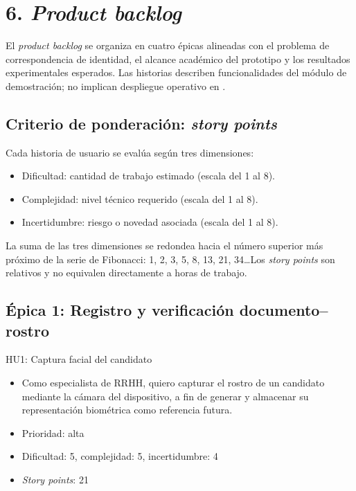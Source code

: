 \documentclass[
  11pt, %
]{charter}
\begin{document}
\section{6. \textit{Product backlog}}
\label{sec:backlog}

El \textit{product backlog} se organiza en cuatro épicas alineadas con el problema de correspondencia de identidad, el alcance académico del prototipo y los resultados experimentales esperados. Las historias describen funcionalidades del módulo de demostración; no implican despliegue operativo en \empclientename.

\subsection{Criterio de ponderación: \textit{story points}}

Cada historia de usuario se evalúa según tres dimensiones:

\begin{itemize}
  \item Dificultad: cantidad de trabajo estimado (escala del 1 al 8).
  \item Complejidad: nivel técnico requerido (escala del 1 al 8).
  \item Incertidumbre: riesgo o novedad asociada (escala del 1 al 8).
\end{itemize}

La suma de las tres dimensiones se redondea hacia el número superior más próximo de la serie de Fibonacci: 1, 2, 3, 5, 8, 13, 21, 34\dots Los \textit{story points} son relativos y no equivalen directamente a horas de trabajo.

\subsection{Épica 1: Registro y verificación documento--rostro}

HU1: Captura facial del candidato
\begin{itemize}
  \item Como especialista de RRHH, quiero capturar el rostro de un candidato mediante la cámara del dispositivo, a fin de generar y almacenar su representación biométrica como referencia futura.
  \item Prioridad: alta
  \item Dificultad: 5, complejidad: 5, incertidumbre: 4
  \item \textit{Story points}: 21
\end{itemize}
\end{document}
